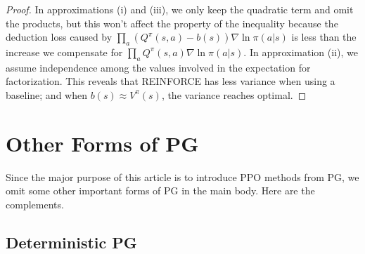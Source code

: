 \begin{proof}
    In approximations (i) and (iii), we only keep the quadratic term and omit the products, but this won't affect the property of the inequality because the deduction loss caused by $\prod_a (Q^\pi(s,a) -b(s)) \nabla\ln\pi(a|s)$ is less than the increase we compensate for $\prod_a Q^\pi(s,a) \nabla\ln\pi(a|s)$. In approximation (ii), we assume independence among the values involved in the expectation for factorization. This reveals that REINFORCE has less variance when using a baseline; and when $b(s)\approx V^\pi(s)$, the variance reaches optimal.
\end{proof}

\newpage
\section{Other Forms of PG}

Since the major purpose of this article is to introduce PPO methods from PG, we omit some other important forms of PG in the main body. Here are the complements.

\subsection{Deterministic PG}

